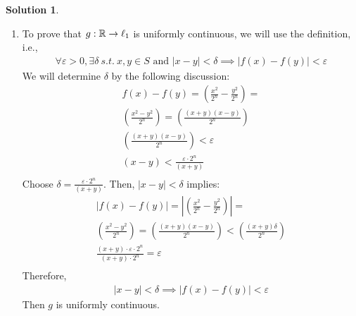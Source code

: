 \documentclass[12pt]{article}
\theoremstyle{definition} %
\newtheorem{solution}{Solution}
\theoremstyle{plain} %
\begin{document}
\begin{solution}
\begin{enumerate}
            \item To prove that \(g: \mathbb{\MakeUppercase{r}} \to \ell_1\) is uniformly continuous, we will use the definition, i.e., 
            \begin{align}
                \forall \varepsilon>0, \exists \delta \ s.t. \ x,y\in S \text{ and } \left\vert x-y \right\vert <\delta \implies \left\vert f(x)-f(y) \right\vert <\varepsilon
            \end{align} 
            We will determine \(\delta\) by the following discussion:
            \begin{align}
                f(x)-f(y) = \left(\frac{x^{2}}{2^{n}}- \frac{y^{2}}{2^{n}}   \right) =\\[10pt] 
                \left( \frac{x^{2}-y^{2}}{2^{n}} \right) = \left( \frac{(x+y)(x-y)}{2^{n}} \right)  \\[10pt] 
                \left( \frac{(x+y)(x-y)}{2^{n}} \right) <\varepsilon \\[10pt] 
                (x-y) < \frac{\varepsilon \cdot 2^{n}}{(x+y)} \\[10pt] 
            \end{align} 
            Choose \(\delta=\frac{\varepsilon \cdot 2^{n}}{(x+y)}\). Then, \(\left\vert x-y \right\vert <\delta \) implies:
            \begin{align}
                \left\vert f(x)-f(y) \right\vert = \left\vert \left(\frac{x^{2}}{2^{n}}- \frac{y^{2}}{2^{n}}   \right) \right\vert  =\\[10pt] 
                \left( \frac{x^{2}-y^{2}}{2^{n}} \right) = \left( \frac{(x+y)(x-y)}{2^{n}} \right) < \left( \frac{(x+y)\delta}{2^{n}} \right) \\[10pt] 
                \frac{(x+y)\cdot \varepsilon \cdot 2^{n}}{(x+y)\cdot 2^{n}} = \varepsilon \\[10pt]  
            \end{align} 
            Therefore, 
            \begin{align}
                \left\vert x-y \right\vert < \delta \implies  \left\vert f(x)-f(y) \right\vert < \varepsilon
            \end{align}
            Then \(g\) is uniformly continuous.
        \end{enumerate}
        

\end{solution}
\end{document}
